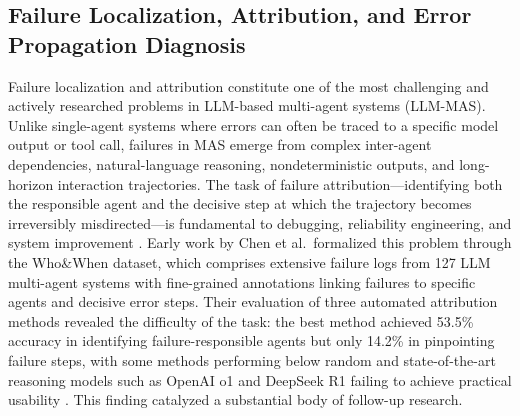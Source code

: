 \documentclass[11pt]{article}
\begin{document}
\subsection{Failure Localization, Attribution, and Error Propagation Diagnosis}

Failure localization and attribution constitute one of the most challenging and actively researched problems in LLM-based multi-agent systems (LLM-MAS). Unlike single-agent systems where errors can often be traced to a specific model output or tool call, failures in MAS emerge from complex inter-agent dependencies, natural-language reasoning, nondeterministic outputs, and long-horizon interaction trajectories. The task of failure attribution---identifying both the responsible agent and the decisive step at which the trajectory becomes irreversibly misdirected---is fundamental to debugging, reliability engineering, and system improvement \cite{ref361}. Early work by Chen et al.~formalized this problem through the Who\&When dataset, which comprises extensive failure logs from 127 LLM multi-agent systems with fine-grained annotations linking failures to specific agents and decisive error steps. Their evaluation of three automated attribution methods revealed the difficulty of the task: the best method achieved 53.5\% accuracy in identifying failure-responsible agents but only 14.2\% in pinpointing failure steps, with some methods performing below random and state-of-the-art reasoning models such as OpenAI o1 and DeepSeek R1 failing to achieve practical usability \cite{ref361}. This finding catalyzed a substantial body of follow-up research.
\end{document}
